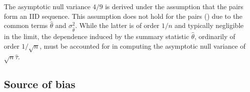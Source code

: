 \documentclass[12pt]{article}
\newcommand{\thetahat}{\hat{\theta}}
\begin{document}
    The asymptotic null variance $4/9$ is derived under the assumption
    that the pairs form an IID sequence. This assumption does not hold
    for the pairs () due to the common terms
    $\hat{\theta}$ and $\sigma^2_{\hat{\theta}}$. While the latter is
    of order $1/n$ and typically negligible in the limit, the
    dependence induced by the summary statistic $\thetahat$,
    ordinarily of order $1/\sqrt{n}$, must be accounted for in
    computing the asymptotic null variance of $\sqrt{n}\hat\tau$.
    
    
  \subsection{Source of bias}\label{section:theory:source of bias}
  
\end{document}
